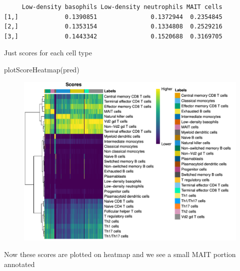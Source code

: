 \documentclass[
  letterpaper,
  DIV=11,
  numbers=noendperiod]{scrartcl}
\newenvironment{Shaded}{\begin{snugshade}}{\end{snugshade}}
\newcommand{\DecValTok}[1]{\textcolor[rgb]{0.68,0.00,0.00}{#1}}
\newcommand{\FunctionTok}[1]{\textcolor[rgb]{0.28,0.35,0.67}{#1}}
\newcommand{\NormalTok}[1]{\textcolor[rgb]{0.00,0.23,0.31}{#1}}
\newcommand{\SpecialCharTok}[1]{\textcolor[rgb]{0.37,0.37,0.37}{#1}}
\begin{document}
\begin{Shaded}
\end{Shaded}

\begin{verbatim}
     Low-density basophils Low-density neutrophils MAIT cells
[1,]             0.1390851               0.1372944  0.2354845
[2,]             0.1353154               0.1334808  0.2529216
[3,]             0.1443342               0.1520688  0.3169705
\end{verbatim}

Just scores for each cell type

\begin{Shaded}
\begin{Highlighting}[]
\FunctionTok{plotScoreHeatmap}\NormalTok{(pred)}
\end{Highlighting}
\end{Shaded}

\begin{figure}[H]

{\centering \includegraphics{2-Lett-data-SingleR_pdf_files/figure-pdf/unnamed-chunk-6-1.pdf}

}

\end{figure}

Now these scores are plotted on heatmap and we see a small MAIT portion
annotated
\end{document}
